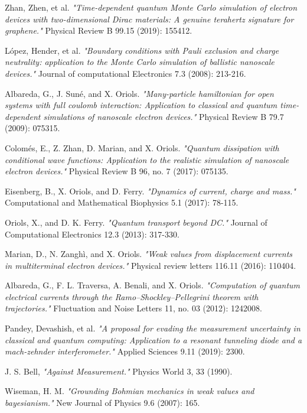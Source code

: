 \documentclass[11pt, a4paper]{article} %
\begin{document}
\begin{thebibliography}{1}
{
Zhan, Zhen, et al. {\em "Time-dependent quantum Monte Carlo simulation of electron devices with two-dimensional Dirac materials: A genuine terahertz signature for graphene."} Physical Review B 99.15 (2019): 155412.

López, Hender, et al. {\em "Boundary conditions with Pauli exclusion and charge neutrality: application to the Monte Carlo simulation of ballistic nanoscale devices."} Journal of computational Electronics 7.3 (2008): 213-216.

Albareda, G., J. Suné, and X. Oriols. {\em "Many-particle hamiltonian for open systems with full coulomb interaction: Application to classical and quantum time-dependent simulations of nanoscale electron devices."} Physical Review B 79.7 (2009): 075315.

Colomés, E., Z. Zhan, D. Marian, and X. Oriols. {\em "Quantum dissipation with conditional wave functions: Application to the realistic simulation of nanoscale electron devices."} Physical Review B 96, no. 7 (2017): 075135.

Eisenberg, B., X. Oriols, and D. Ferry. {\em "Dynamics of current, charge and mass."} Computational and Mathematical Biophysics 5.1 (2017): 78-115.

Oriols, X., and D. K. Ferry. {\em "Quantum transport beyond DC."} Journal of Computational Electronics 12.3 (2013): 317-330.

Marian, D., N. Zanghì, and X. Oriols. {\em "Weak values from displacement currents in multiterminal electron devices."} Physical review letters 116.11 (2016): 110404.

Albareda, G., F. L. Traversa, A. Benali, and X. Oriols. {\em "Computation of quantum electrical currents through the Ramo–Shockley–Pellegrini theorem with trajectories."} Fluctuation and Noise Letters 11, no. 03 (2012): 1242008.

Pandey, Devashish, et al. {\em "A proposal for evading the measurement uncertainty in classical and quantum computing: Application to a resonant tunneling diode and a mach-zehnder interferometer."} Applied Sciences 9.11 (2019): 2300.

J. S. Bell, {\em "Against Measurement."} Physics World 3, 33 (1990).

Wiseman, H. M. {\em "Grounding Bohmian mechanics in weak values and bayesianism."} New Journal of Physics 9.6 (2007): 165.

}
\end{thebibliography}
\end{document}
